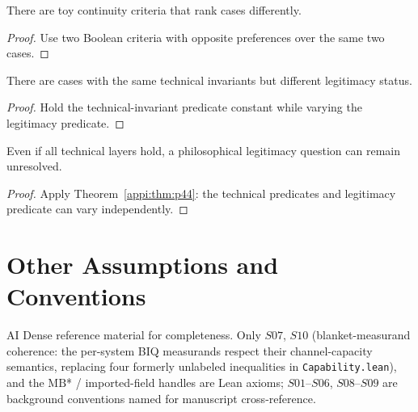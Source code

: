 \begin{theorem}
\label{appi:thm:p42}
There are toy continuity criteria that rank cases differently.
\end{theorem}
\begin{proof}
Use two Boolean criteria with opposite preferences over the same two cases.
\end{proof}

\begin{theorem}
\label{appi:thm:p44}
There are cases with the same technical invariants but different legitimacy status.
\end{theorem}
\begin{proof}
Hold the technical-invariant predicate constant while varying the legitimacy predicate.
\end{proof}

\begin{corollary}
\label{appi:cor:p45}
Even if all technical layers hold, a philosophical legitimacy question can remain unresolved.
\end{corollary}
\begin{proof}
Apply Theorem~\ref{appi:thm:p44}: the technical predicates and legitimacy predicate can vary independently.
\end{proof}

\authbarneedspace
\section{Other Assumptions and Conventions}
\label{sec:appi-other-assumptions}
\begin{authbar}{AI}
Dense reference material for completeness.
Only \(S07\), \(S10\) (blanket-measurand coherence: the per-system BIQ measurands respect their channel-capacity semantics, replacing four formerly unlabeled inequalities in \texttt{Capability.lean}), and the \(\text{MB}\)* / imported-field handles are Lean axioms; \(S01\)--\(S06\), \(S08\)--\(S09\) are background conventions named for manuscript cross-reference.

\end{authbar}
\authbarsubneedspace
